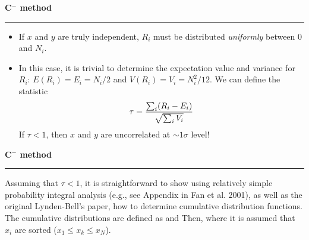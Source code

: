 \documentclass[letterpaper,landscape]{slides}
\begin{document}
\begin{slide}
\begin{center}
\bfseries
{\large {\color{red} C$^-$ method}}
\end{center}
\vskip 0.2in
\hrule

\begin{itemize}
\item If $x$ and $y$ are truly independent, $R_i$ must be distributed 
      {\it uniformly} between 0 and $N_i$.
\item In this case, it is trivial to determine 
      the expectation value and variance for $R_i$: $E(R_i) = E_i = N_i/2$
      and $V(R_i) = V_i = N_i^2/12$. We can define the statistic
\begin{equation}
      \tau = {\sum_i (R_i - E_i)\over \sqrt {\sum_i V_i   }   } 
\end{equation}
If $\tau < 1$, then $x$ and $y$ are uncorrelated at $\sim1 \sigma$ level! 
\end{itemize}

\vskip -0.7in
\phantom{x}

\vfill
\end{slide}
 



\begin{slide}
\begin{center}
\bfseries
{\large {\color{red} C$^-$ method}}
\end{center}
\vskip 0.2in
\hrule

Assuming that $\tau<1$, it is straightforward to show using relatively simple probability integral 
analysis (e.g., see Appendix in Fan et al. 2001), as well as the original Lynden-Bell's paper,
how to determine cumulative distribution functions.
The cumulative distributions are defined as 
and 
Then, 
where it is assumed that $x_i$ are sorted ($x_1 \le x_k \le x_N$).

\vskip -0.7in
\phantom{x}

\vfill
\end{slide}
 
\end{document}
